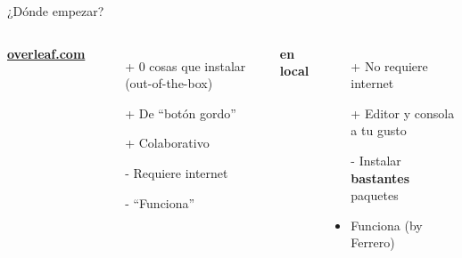 \begin{frame}{¿Dónde empezar?}
    \begin{columns}

            \pause

            \begin{center}
                \textbf{\href{https://overleaf.com}{overleaf.com}}
            \end{center}
            \begin{itemize}
                \item[+] 0 cosas que instalar (out-of-the-box) 
                \item[+] De ``botón gordo''
                \item[+] Colaborativo
                \item[-] Requiere internet
                \item[-] ``Funciona''
            \end{itemize}

            \pause

            
            \begin{center}
                \textbf{en local}        
            \end{center}
            \begin{itemize}
                \item[+] No requiere internet
                \item[+] Editor y consola a tu gusto
                \item[-] Instalar \textbf{bastantes} paquetes
                \item Funciona (by Ferrero)
            \end{itemize}

    \end{columns}
\end{frame}